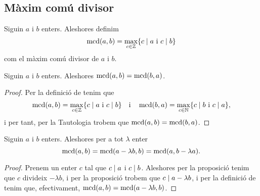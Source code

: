 \documentclass[../Apunts.tex]{subfiles}
\begin{document}
	\subsection{Màxim comú divisor}
	\begin{definition}
		\label{def:màxim comú divisor}
		Siguin \(a\) i \(b\) enters. Aleshores definim
		\[\operatorname{mcd}(a,b)=\max_{c\in\mathbb{Z}}\{c\mathrel{|} a\text{ i }c\mathrel{|} b\}\]
		com el màxim comú divisor de \(a\) i \(b\).
	\end{definition}
	\begin{proposition}
		Siguin \(a\) i \(b\) enters. Aleshores \(\operatorname{mcd}(a,b)=\operatorname{mcd}(b,a)\).
		\begin{proof}
			Per la definició de  tenim que
			\[\operatorname{mcd}(a,b)=\max_{c\in\mathbb{Z}}\{c\mathrel{|} a\text{ i }c\mathrel{|} b\}\quad\text{i}\quad\operatorname{mcd}(b,a)=\max_{c\in\mathbb{N}}\{c\mathrel{|} b\text{ i }c\mathrel{|} a\},\]
			i per tant, per la Tautologia  trobem que \(\operatorname{mcd}(a,b)=\operatorname{mcd}(b,a)\).
		\end{proof}
	\end{proposition}
	\begin{proposition}
		Siguin \(a\) i \(b\) enters. Aleshores per a tot \(\lambda\) enter
		\[\operatorname{mcd}(a,b)=\operatorname{mcd}(a-\lambda b,b)=\operatorname{mcd}(a,b-\lambda a).\]
		\begin{proof}
			Prenem un enter \(c\) tal que \(c\mathrel{|} a\) i \(c\mathrel{|} b\). Aleshores per la proposició  tenim que \(c\) divideix \(-\lambda b\), i per la proposició  trobem que \(c\mathrel{|} a-\lambda b\), i per la definició de  tenim que, efectivament, \(\operatorname{mcd}(a,b)=\operatorname{mcd}(a-\lambda b,b)\).
		\end{proof}
	\end{proposition}
\end{document}
